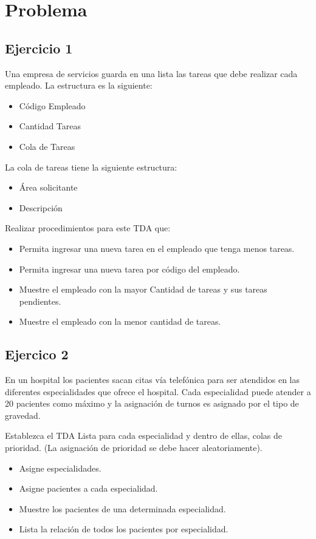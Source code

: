 \documentclass[a4paper,12pt]{article}
\begin{document}
 \section{Problema}
 \subsection{Ejercicio 1}
 Una empresa de servicios guarda en una lista las tareas que debe realizar cada empleado. La estructura es la siguiente:
 \begin{itemize}
  \item Código Empleado
  \item Cantidad Tareas
  \item Cola de Tareas\par \smallskip
 \end{itemize}
 La cola de tareas tiene la siguiente estructura:
 \begin{itemize}
  \item Área solicitante
  \item Descripción \par \smallskip
 \end{itemize}
 Realizar procedimientos para este TDA que:
 \begin{itemize}
  \item Permita ingresar una nueva tarea en el empleado que tenga menos tareas.
  \item Permita ingresar una nueva tarea por código del empleado.
  \item Muestre el empleado con la mayor Cantidad de tareas y sus tareas pendientes.
  \item Muestre el empleado con la menor cantidad de tareas.
 \end{itemize}
 \subsection{Ejercico 2}
 En un hospital los pacientes sacan citas vía telefónica para ser atendidos en las diferentes especialidades que ofrece el hospital.
 Cada especialidad puede atender a 20 pacientes como máximo y la asignación de turnos es asignado por el tipo de gravedad.\par \smallskip
 Establezca el TDA Lista para cada especialidad y dentro de ellas, colas de prioridad. (La asignación de prioridad se debe hacer aleatoriamente).
 \begin{itemize}
  \item Asigne especialidades.
  \item Asigne pacientes a cada especialidad.
  \item Muestre los pacientes de una determinada especialidad.
  \item Lista la relación de todos los pacientes por especialidad.
 \end{itemize}
\twocolumn
\end{document}
